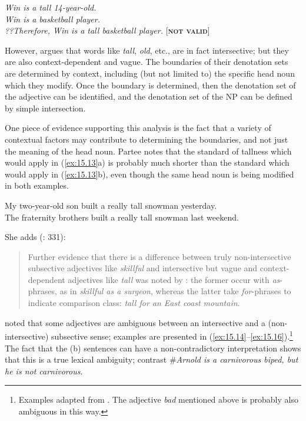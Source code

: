 \ea \label{ex:15.12}
\textit{Win is a tall 14-year-old.}\\
\textit{Win is a basketball player.\\
\FelixHRule
??Therefore, Win is a tall basketball player.} \hfill   [\textbf{\textsc{not valid}}]
\z


However, \citet{Siegel1976} argues that words like \textit{tall}, \textit{old}, etc., are in fact intersective; but they are also context-dependent and vague. The boundaries of their denotation sets are determined by context, including (but not limited to) the specific head noun which they modify. Once the boundary is determined, then the denotation set of the adjective can be identified, and the denotation set of the NP can be defined by simple intersection.



One piece of evidence supporting this analysis is the fact that a variety of contextual factors may contribute to determining the boundaries, and not just the meaning of the head noun. Partee notes that the standard of tallness which would apply in (\ref{ex:15.13}a) is probably much shorter than the standard which would apply in (\ref{ex:15.13}b), even though the same head noun is being modified in both examples.


\ea \label{ex:15.13}
\ea  My two-year-old son built a really tall snowman yesterday.\\
\ex The fraternity brothers built a really tall snowman last weekend.
                       \z
\z


She adds (\citeyear{Partee1995}: 331):
\begin{quote}
Further evidence that there is a difference between truly non-intersective subsective adjectives like \textit{skillful} and intersective but vague and context-dependent adjectives like \textit{tall} was noted by \citet{Siegel1976}: the former occur with \textit{as}-phrases, as in \textit{skillful as a surgeon}, whereas the latter take \textit{for}-phrases to indicate comparison class: \textit{tall for an East coast mountain}. 
\end{quote}


\citet{Bolinger1967} noted that some adjectives are ambiguous between an intersective and a (non-intersective) subsective sense; examples are presented in (\ref{ex:15.14}--\ref{ex:15.16}).\footnote{Examples adapted from \citet[ch. 2]{Morzycki2013}. The adjective \textit{bad} mentioned above is probably also ambiguous in this way.} The fact that the (b) sentences can have a non-contradictory interpretation shows that this is a true lexical ambiguity; contrast \#\textit{Arnold is a carnivorous biped, but he is not carnivorous}.


